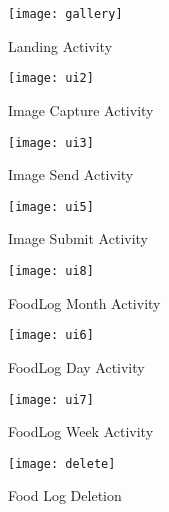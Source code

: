 \begin{figure} 
  \label{uiDesign1} 
  \begin{minipage}[b]{0.5\linewidth}
    \centering
    \texttt{[image: gallery]} 
    \caption{Landing Activity} 
  \label{fig:gallery}
    \vspace{4ex}
  \end{minipage}%
  \begin{minipage}[b]{0.5\linewidth}
    \centering
    \texttt{[image: ui2]} 
    \caption{Image Capture Activity} 
  \label{fig:ui2}
    \vspace{4ex}
  \end{minipage} 
  \begin{minipage}[b]{0.5\linewidth}
    \centering
    \texttt{[image: ui3]} 
    \caption{Image Send Activity} 
    \label{fig:ui3}
    \vspace{4ex}
  \end{minipage}%
  \begin{minipage}[b]{0.5\linewidth}
    \centering
    \texttt{[image: ui5]} 
    \caption{Image Submit Activity} 
    \label{fig:ui5}
    \vspace{4ex}
  \end{minipage} 
\end{figure}

\begin{figure}
  \label{uiDesign2} 
  \begin{minipage}[b]{0.5\linewidth}
    \centering
    \texttt{[image: ui8]} 
    \caption{FoodLog Month Activity} 
    \label{fig:ui8}
    \vspace{4ex}
  \end{minipage}
  \begin{minipage}[b]{0.5\linewidth}
    \centering
    \texttt{[image: ui6]} 
    \caption{FoodLog Day Activity} 
  \label{fig:ui6}
    \vspace{4ex}
  \end{minipage} 
  \begin{minipage}[b]{0.5\linewidth}
    \centering
    \texttt{[image: ui7]} 
    \caption{FoodLog Week Activity} 
    \label{fig:ui7}
    \vspace{4ex}
  \end{minipage}%
  \begin{minipage}[b]{0.5\linewidth}
    \centering
    \texttt{[image: delete]} 
    \caption{Food Log Deletion} 
  \label{fig:delete}
    \vspace{4ex} 
    \end{minipage}%
\end{figure}
\clearpage


